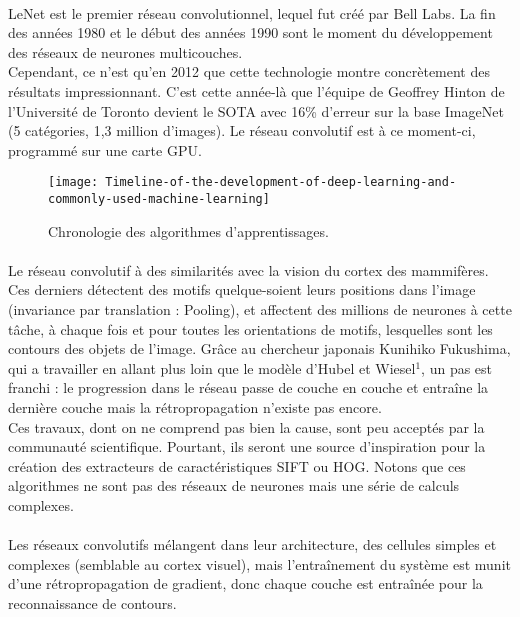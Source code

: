 \documentclass[
10pt, %
a4paper, %
oneside, %
headinclude,footinclude, %
]{scrartcl}
\begin{document}
\paragraph{}LeNet est le premier réseau convolutionnel, lequel fut créé par Bell Labs.
La fin des années 1980 et le début des années 1990 sont le moment du développement des réseaux de neurones multicouches.\\
Cependant, ce n’est qu’en 2012 que cette technologie montre concrètement des résultats impressionnant. C’est cette année-là que l’équipe de Geoffrey Hinton  de l’Université de Toronto devient le SOTA avec 16\% d’erreur sur la base ImageNet (5 catégories, 1,3 million d’images). Le réseau convolutif est à ce moment-ci, programmé sur une carte GPU.
\begin{figure}[htb]
\centering 
\texttt{[image: Timeline-of-the-development-of-deep-learning-and-commonly-used-machine-learning]} 
\caption[Chronologie des algorithmes d’apprentissages]{Chronologie des algorithmes d’apprentissages.} 
\label{fig:gallery} 
\end{figure}
\paragraph{}Le réseau convolutif à des similarités avec la vision du cortex des mammifères. Ces derniers détectent des motifs quelque-soient leurs positions dans l’image (invariance par translation : Pooling), et affectent des millions de neurones à cette tâche, à chaque fois et pour toutes les orientations de motifs, lesquelles sont les contours des objets de l’image.
Grâce au chercheur japonais Kunihiko Fukushima, qui a travailler en allant plus loin que le modèle d’Hubel et Wiesel$^{1}$\let\thefootnote\relax{}, un pas est franchi : le progression dans le réseau passe de couche en couche et entraîne la dernière couche mais la rétropropagation n’existe pas encore\cite{LeCun_1998_gblatdr}. \\Ces travaux, dont on ne comprend pas bien la cause, sont peu acceptés par la communauté scientifique. Pourtant, ils seront une source d’inspiration pour la création des extracteurs de caractéristiques \gls{SIFT} ou \gls{HOG}. Notons que ces algorithmes ne sont pas des réseaux de neurones mais une série de calculs complexes.
\paragraph{}Les réseaux convolutifs mélangent dans leur architecture, des cellules simples et complexes (semblable au cortex visuel), mais l’entraînement du système est munit d’une rétropropagation de gradient, donc chaque couche est entraînée pour la reconnaissance de contours.
\end{document}
